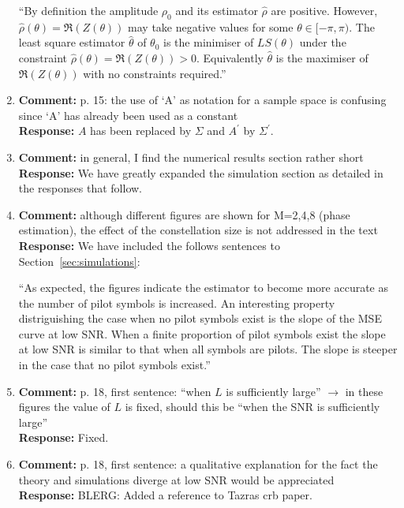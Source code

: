 \documentclass{article}
\begin{document}
\begin{enumerate}
``By definition the amplitude $\rho_0$ and its estimator $\hat{\rho}$ are positive.  However, $\hat{\rho}(\theta) = \Re(Z(\theta))$ may take negative values for some $\theta \in [-\pi,\pi)$.  The least square estimator $\hat{\theta}$ of $\theta_0$ is the minimiser of $LS(\theta)$ under the constraint $\hat{\rho}(\theta) = \Re(Z(\theta)) > 0$.  Equivalently $\hat{\theta}$ is the maximiser of $\Re(Z(\theta))$ with no constraints required.''

\item \textbf{Comment:} p. 15: the use of `A' as notation for a sample space is confusing since `A' has already been used as a constant \\
\textbf{Response:} $A$ has been replaced by $\Sigma$ and $A^\prime$ by $\Sigma^\prime$.

\item \textbf{Comment:} in general, I find the numerical results section rather short \\
\textbf{Response:} We have greatly expanded the simulation section as detailed in the responses that follow.

\item \textbf{Comment:} although different figures are shown for M=2,4,8 (phase estimation), the effect of the constellation size is not addressed in the text  \\
\textbf{Response:}  We have included the follows sentences to Section~\ref{sec:simulations}:

``As expected, the figures indicate the estimator to become more accurate as the number of pilot symbols is increased.  An interesting property distriguishing the case when no pilot symbols exist is the slope of the MSE curve at low SNR.  When a finite proportion of pilot symbols exist the slope at low SNR is similar to that when all symbols are pilots.  The slope is steeper in the case that no pilot symbols exist.''

\item \textbf{Comment:} p. 18, first sentence: ``when $L$ is sufficiently large'' $\to$ in these figures the value of $L$ is fixed, should this be ``when the SNR is sufficiently large''  \\
\textbf{Response:} Fixed.

\item \textbf{Comment:} p. 18, first sentence: a qualitative explanation for the fact the theory and simulations diverge at low SNR would be appreciated  \\
\textbf{Response:} BLERG: Added a reference to Tazras crb paper.


\end{enumerate}
\end{document}
